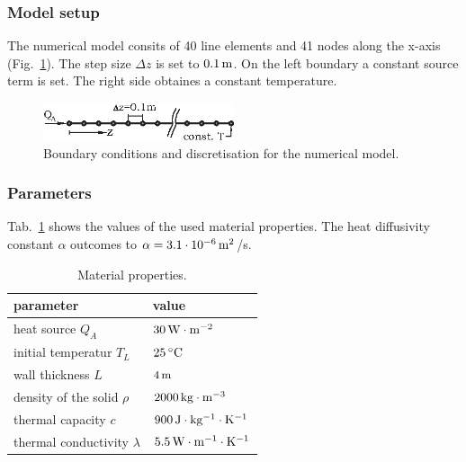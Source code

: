 \subsubsection{Model setup}

The numerical model consits of 40 line elements and 41 nodes along the x-axis (Fig.~\ref{fig-mslhdw}). The step size $\Delta z$ is set to $\unit[0.1]{m}$. On the left boundary a constant source term is set. The right side obtaines a constant temperature.
\begin{figure}%
\centering
\includegraphics[width=0.5\textwidth]{T/figures/ms-lhdw.eps}
\caption{\label{fig-mslhdw}Boundary conditions and discretisation for the numerical model.}
\end{figure}

\subsubsection{Parameters}

Tab.~\ref{tab-ldhwp} shows the values of the used material properties. The heat diffusivity constant $\alpha$ 
outcomes to $\alpha = \unit[3.1 \cdot 10 ^{-6}]{m^{2}}$/s. 
\begin{table}[h]
\caption{\label{tab-ldhwp}Material properties.}
\begin{center}
\begin{tabular}{ll}
\toprule
parameter 						& value \\
\midrule
heat source $Q_A$ 				& $\unit[30]{W \cdot m^{-2}}$ \\			
initial temperatur $T_L$		& $\unit[25]{^{\circ}C}$ \\
wall thickness $L$				& $\unit[4]{m}$ \\
density of the solid $\rho$ 	& $\unit[2000]{kg \cdot m^{-3}}$ \\			
thermal capacity	$c$  		& $\unit[900]{J \cdot kg^{-1} \cdot K^{-1}}$ \\
thermal conductivity $\lambda$	& $\unit[5.5]{W \cdot m^{-1} \cdot K^{-1}}$ \\
\bottomrule
\end{tabular}
\end{center}
\end{table}

